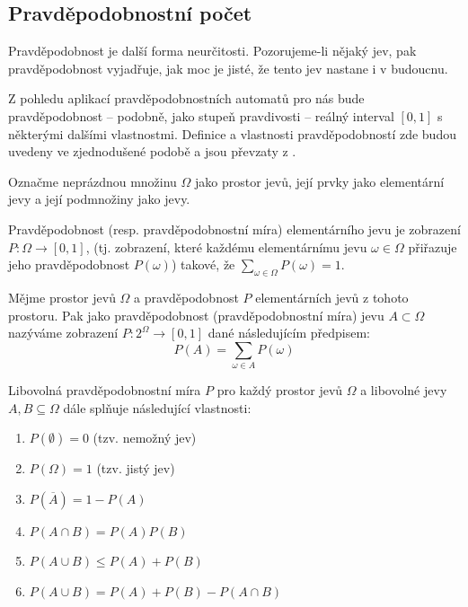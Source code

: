 \documentclass[a4paper,10pt]{article}
\begin{document}
\subsection{Pravděpodobnostní počet}
Pravděpodobnost je další forma neurčitosti. Pozorujeme-li nějaký jev, pak pravděpodobnost vyjadřuje, jak moc je jisté, že tento jev nastane i v budoucnu. 

Z pohledu aplikací pravděpodobnostních automatů pro nás bude pravděpodobnost -- podobně, jako stupeň pravdivosti -- reálný interval $[0, 1]$ s některými dalšími vlastnostmi. Definice a vlastnosti pravděpodobností zde budou uvedeny ve zjednodušené podobě a jsou převzaty z \cite{Joh-ProbStaComSci}. 

\begin{definition}
  Označme neprázdnou množinu $\Omega$ jako prostor jevů, její prvky jako elementární jevy a její podmnožiny jako jevy.  
\end{definition}

\begin{definition}
 Pravděpodobnost (resp. pravděpodobnostní míra) elementárního jevu je zobrazení $P: \Omega \rightarrow [0,1]$, (tj. zobrazení, které každému elementárnímu jevu $\omega \in \Omega$ přiřazuje jeho pravděpodobnost $P(\omega)$) takové, že $\sum_{\omega \in \Omega} P(\omega) = 1$.
\end{definition}

\begin{definition}
 Mějme prostor jevů $\Omega$ a pravděpodobnost $P$ elementárních jevů z tohoto prostoru. Pak jako pravděpodobnost (pravděpodobnostní míra) jevu $A \subset \Omega$ nazýváme zobrazení $P: 2^\Omega \rightarrow [0,1]$ dané následujícím předpisem:
  $$
    P(A) = \sum_{\omega \in A} P(\omega)
  $$
\end{definition}

Libovolná pravděpodobnostní míra $P$ pro každý prostor jevů $\Omega$ a libovolné jevy $A, B \subseteq \Omega$ dále splňuje následující vlastnosti:
\begin{enumerate}
 \item $P(\emptyset) = 0$ (tzv. nemožný jev)
 \item $P(\Omega) = 1$ (tzv. jistý jev)
 \item $P(\overline{A}) = 1 - P(A)$
 \item $P(A \cap B) = P(A) P(B)$
 \item $P(A \cup B) \leq P(A) + P(B)$
 \item $P(A \cup B) = P(A) + P(B) - P(A \cap B)$
\end{enumerate}
\end{document}
